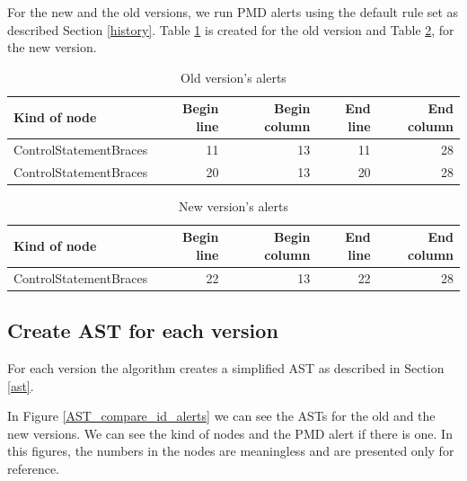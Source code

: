 \documentclass[
]{article}
\begin{document}
For the new and the old versions, we run PMD alerts using the default
rule set as described Section \ref{history}. Table \ref{old_alerts} is
created for the old version and Table \ref{new_alerts}, for the new
version.

\small

\begin{table}[H]

\caption{\label{tab:unnamed-chunk-3}Old version's alerts\label{old_alerts}}
\centering
\begin{tabular}[t]{l|r|r|r|r}
\hline
Kind of node & Begin line & Begin column & End line & End column\\
\hline
\rowcolor{gray!6}  ControlStatementBraces & 11 & 13 & 11 & 28\\
\hline
ControlStatementBraces & 20 & 13 & 20 & 28\\
\hline
\end{tabular}
\end{table}

\normalsize

\small

\begin{table}[H]

\caption{\label{tab:unnamed-chunk-4}New version's alerts\label{new_alerts}}
\centering
\begin{tabular}[t]{l|r|r|r|r}
\hline
Kind of node & Begin line & Begin column & End line & End column\\
\hline
\rowcolor{gray!6}  ControlStatementBraces & 22 & 13 & 22 & 28\\
\hline
\end{tabular}
\end{table}

\normalsize

\subsection{Create AST for each version}

For each version the algorithm creates a simplified AST as described in
Section \ref{ast}.

In Figure \ref{AST_compare_id_alerts} we can see the ASTs for the old
and the new versions. We can see the kind of nodes and the PMD alert if
there is one. In this figures, the numbers in the nodes are meaningless
and are presented only for reference.

\small
\end{document}
